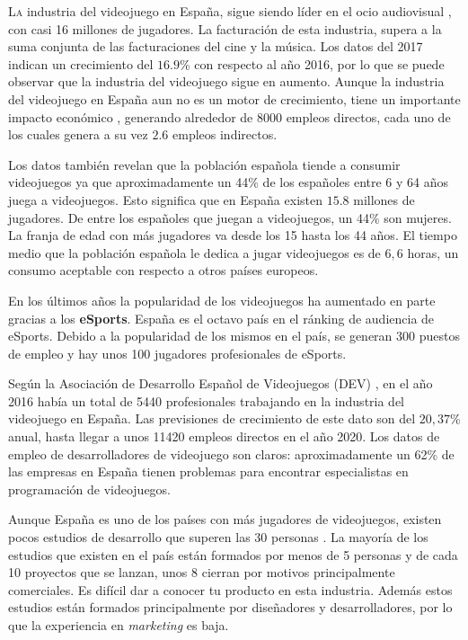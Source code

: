 \lettrine{L}{a} industria del videojuego en España, sigue siendo líder en el ocio audiovisual \cite{1}, con casi 16 millones de jugadores. La facturación de esta industria, supera a la suma conjunta de las facturaciones del cine y la música. Los datos del 2017 indican un crecimiento del $16.9$\% con respecto al año 2016, por lo que se puede observar que la industria del videojuego sigue en aumento. Aunque la industria del videojuego en España aun no es un motor de crecimiento, tiene un importante impacto económico \cite{2}, generando alrededor de 8000 empleos directos, cada uno de los cuales genera a su vez $2.6$ empleos indirectos.

Los datos también revelan que la población española tiende a consumir videojuegos ya que aproximadamente un 44\% de los españoles entre 6 y 64 años juega a videojuegos. Esto significa que en España existen $15.8$ millones de jugadores. De entre los españoles que juegan a videojuegos, un 44\% son mujeres. La franja de edad con más jugadores va desde los 15 hasta los 44 años. El tiempo medio que la población española le dedica a jugar videojuegos es de $6,6$ horas, un consumo aceptable con respecto a otros países europeos.

En los últimos años la popularidad de los videojuegos ha aumentado en parte gracias a los \textbf{eSports}. España es el octavo país en el ránking de audiencia de eSports. Debido a la popularidad de los mismos en el país, se generan 300 puestos de empleo y hay unos 100 jugadores profesionales de eSports.

Según la Asociación de Desarrollo Español de Videojuegos (DEV) \cite{3}, en el año 2016 había un total de 5440 profesionales trabajando en la industria del videojuego en España. Las previsiones de crecimiento de este dato son del $20,37$\% anual, hasta llegar a unos 11420 empleos directos en el año 2020. Los datos de empleo de desarrolladores de videojuego son claros: aproximadamente un 62\% de las empresas en España tienen problemas para encontrar especialistas en programación de videojuegos. 

Aunque España es uno de los países con más jugadores de videojuegos, existen pocos estudios de desarrollo que superen las 30 personas \cite{4}. La mayoría de los estudios que existen en el país están formados por menos de 5 personas y de cada 10 proyectos que se lanzan, unos 8 cierran por motivos principalmente comerciales. Es difícil dar a conocer tu producto en esta industria. Además estos estudios están formados principalmente por diseñadores y desarrolladores, por lo que la experiencia en \textit{marketing} es baja.

